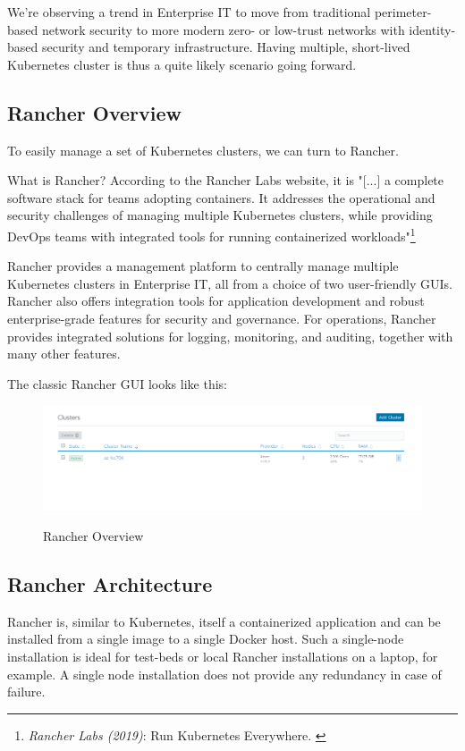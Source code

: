 We're observing a trend in Enterprise IT to move from traditional perimeter-based network security to more modern zero- or low-trust networks with identity-based security and temporary infrastructure. Having multiple, short-lived Kubernetes cluster is thus a quite likely scenario going forward.

\subsection{Rancher Overview}

To easily manage a set of Kubernetes clusters, we can turn to Rancher.

What is Rancher? According to the Rancher Labs website, it is "[...] a complete software stack for teams adopting containers. It addresses the operational and security challenges of managing multiple Kubernetes clusters, while providing DevOps teams with integrated tools for running containerized workloads"\footnote{\textit{Rancher Labs (2019)}: Run Kubernetes Everywhere. \cite{rancher}}

Rancher provides a management platform to centrally manage multiple Kubernetes clusters in Enterprise IT, all from a choice of two user-friendly GUIs. Rancher also offers integration tools for application development and robust enterprise-grade features for security and governance. For operations, Rancher provides integrated solutions for logging, monitoring, and auditing, together with many other features.

The classic Rancher GUI looks like this:

\begin{figure}[H]
\centering
\caption {Rancher Overview}
\includegraphics[width=\linewidth]{images/cluster-overview.png}
\label{fig:rancherOverview}
\end{figure}

\subsection{Rancher Architecture}

Rancher is, similar to Kubernetes, itself a containerized application and can be installed from a single image to a single Docker host. Such a single-node installation is ideal for test-beds or local Rancher installations on a laptop, for example. A single node installation does not provide any redundancy in case of failure.

